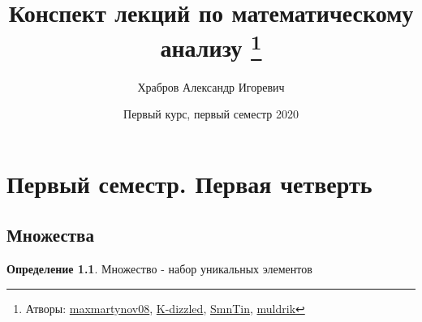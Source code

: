 \documentclass[12pt,letterpaper]{report}
\title{Конспект лекций по математическому анализу 
\thanks{Атворы: \href{https://github.com/maxmartynov08}{maxmartynov08}, \href{https://github.com/K-dizzled}{K-dizzled}, \href{https://github.com/SmnTin}{SmnTin}, \href{https://github.com/muldrik}{muldrik}}}
\author{Храбров Александр Игоревич}
\date{Первый курс, первый семестр 2020}
\theoremstyle{definition}
\newtheorem*{conj}{Определение}
\begin{document}
\fi
\maketitle
\tableofcontents
\newpage
\chapter{Первый семестр. Первая четверть}
\section{Множества}
\begin{conj} Множество - набор уникальных элементов \end{conj}
\end{document}
